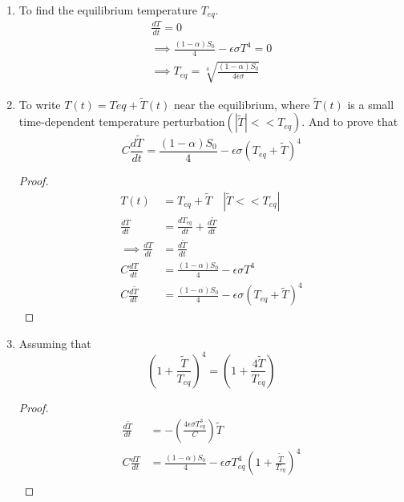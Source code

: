 \documentclass[12pt,a4paper]{article}
\begin{document}
\begin{enumerate}
\item To find  the equilibrium temperature $T_{eq}$.
\begin{align*}
    \frac{dT}{dt}     =  0\\
    \implies \frac{  (1 - \alpha ) S_0}{ 4}    -  \epsilon  \sigma   T^4   = 0 \\
    \implies T_{eq}  =  \sqrt[4]{    \frac{   (1  -  \alpha )  S_0 }{ 4 \epsilon  \sigma   }   }
\end{align*}
\item To write $T(t) = Teq + \tilde{T }(t)$  near the equilibrium, where $ \tilde{T }(t)$ is a small time-dependent temperature perturbation$ (| \tilde{T } | << T_{eq})$.  And to  prove that
\begin{equation}
C \frac{d\tilde{T}}{dt}    =  \frac{  (1 - \alpha ) S_0}{ 4}    -  \epsilon  \sigma    \left( T_{eq}  +   \tilde{T}    \right)^4
\end{equation}
\begin{proof}
    \begin{align*}
        T(t)  &=  T_{eq}  + \tilde{T} \quad   |\tilde{T} <<  T_{eq}|\\
        \frac{dT}{ dt}   &=  \frac{dT_{eq}}{   dt}   +  \frac{d\tilde{T}}{dt}  \\
        \implies \frac{dT}{ dt}   &=   \frac{d\tilde{T}}{dt}  \\
        C \frac{dT}{dt}    &=  \frac{  (1 - \alpha ) S_0}{ 4}    -  \epsilon  \sigma   T^4 \\
        C \frac{d\tilde{T}}{dt}    &=  \frac{  (1 - \alpha ) S_0}{ 4}    -  \epsilon  \sigma    \left( T_{eq}  +   \tilde{T}    \right)^4
    \end{align*}
\end{proof}
\item Assuming that 
\begin{equation}
      \left(      1 + \frac{\tilde{T}}{T_{eq}}  \right)^4   =   \left(     1  +  \frac{4\tilde{T}}{T_{eq}}   \right)
\end{equation}
\begin{proof}
    \begin{align*}
        \frac{d\tilde{T}}{dt}    &=   - \left(    \frac{  4 \epsilon  \sigma T_{eq}^3   }{C}     \right)  \tilde{T}\\
        C \frac{dT}{dt}   &=    \frac{(1-\alpha) S_0}{4}     -  \epsilon  \sigma   T_{eq}^4      \left(      1 + \frac{\tilde{T}}{T_{eq}}  \right)^4 \\

\end{align*}
\end{proof}
\end{enumerate}
\end{document}
